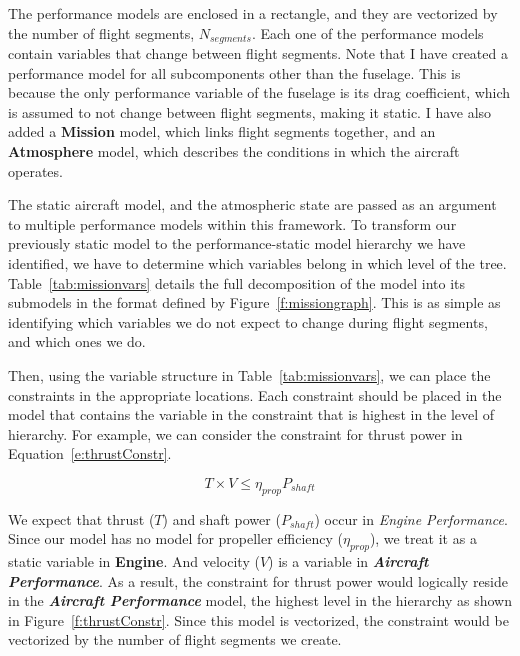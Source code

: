 The performance models are enclosed in a rectangle, and they are
vectorized by the number of flight segments, $N_{segments}$. Each
one of the performance models contain variables that change between flight segments.
Note that I have created a performance model for all subcomponents other than the
fuselage. This is because the only performance variable of the fuselage is its drag
coefficient, which is assumed to not change between flight segments, making it static. I
have also added a \textbf{Mission} model, which links flight segments together,
and an \textbf{Atmosphere} model, which describes the conditions in which the aircraft
operates.

The static aircraft model, and the atmospheric state are passed as an argument to multiple
performance models within this framework. To transform our previously static model to
the performance-static model hierarchy we have identified,
we have to determine which variables
belong in which level of the tree. Table~\ref{tab:missionvars} details the full
decomposition of the model into its submodels in the format defined
by Figure~\ref{f:missiongraph}. This is as simple as identifying which variables
we do not expect to change during flight segments, and which ones we do.

\begin{center}

    \label{tab:missionvars}
\end{center}

Then, using the variable structure in Table~\ref{tab:missionvars}, we can place the
constraints in the appropriate locations. Each constraint should be placed
in the model that contains the variable in the constraint that is highest in the level of hierarchy. For example,
we can consider the constraint for thrust power in Equation~\ref{e:thrustConstr}.

\begin{equation}
    \label{e:thrustConstr}
T \times V \leq \eta_{prop} P_{shaft}
\end{equation}

We expect that thrust ($T$) and shaft power ($P_{shaft}$) occur
in \textit{Engine Performance}. Since our model has no model for propeller efficiency ($\eta_{prop}$), we treat it
as a static variable in \textbf{Engine}. And velocity ($V$) is a variable in \textbf{\textit{Aircraft {Performance}}}.
As a result, the constraint for thrust power would logically reside in the \textbf{\textit{Aircraft {Performance}}}
model, the highest level in the hierarchy as shown in Figure~\ref{f:thrustConstr}. Since this model is vectorized,
the constraint would be vectorized by the number of flight segments we create.

